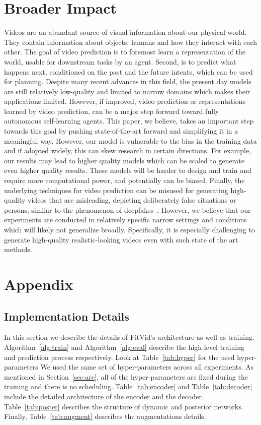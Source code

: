 \documentclass{article}
\newcommand{\model}{FitVid\xspace}
\begin{document}
\section*{Broader Impact}
\label{sec:impact}
Videos are an abundant source of visual information about our physical world. They contain information about objects, humans and how they interact with each other. The goal of video prediction is to foremost learn a representation of the world, usable for downstream tasks by an agent. Second, is to predict what happens next, conditioned on the past and the future intents, which can be used for planning. Despite many recent advances in this field, the present day models are still relatively low-quality and limited to narrow domains which makes their applications limited. However, if improved, video prediction or representations learned by video prediction, can be a major step forward toward fully autonomous self-learning agents. This paper, we believe, takes an important step towards this goal by pushing state-of-the-art forward and simplifying it in a meaningful way. However, our model is vulnerable to the bias in the training data and if adopted widely, this can skew research in certain directions. For example, our results may lead to higher quality models which can be scaled to generate even higher quality results. These models will be harder to design and train and require more computational power, and potentially can be biased. Finally, the underlying techniques for video prediction can be misused for generating high-quality videos that are misleading, depicting deliberately false situations or persons, similar to the phenomenon of deepfakes~\citep{korshunov2018deepfakes}. However, we believe that our experiments are conducted in relatively specific narrow settings and conditions which will likely not generalize broadly. Specifically, it is especially challenging to generate high-quality realistic-looking videos even with such state of the art methods.

\small



\clearpage
\appendix
\section{Appendix}

\subsection{Implementation Details}
\label{app:details}
In this section we describe the details of \model's architecture as well as training. Algorithm~\ref{alg:train} and Algorithm~\ref{alg:eval} describe the high-level training and prediction process respectively. Look at Table~\ref{tab:hyper} for the used hyper-parameters We used the same set of hyper-parameters across all experiments. As mentioned in Section~\ref{sec:arc}, all of the hyper-parameters are fixed during the training and there is no scheduling. Table~\ref{tab:encoder} and Table~\ref{tab:decoder} include the detailed architecture of the encoder and the decoder. Table~\ref{tab:poster} describes the structure of dynamic and posterior networks. Finally, Table~\ref{tab:augment} describes the augmentations details. 
\end{document}
